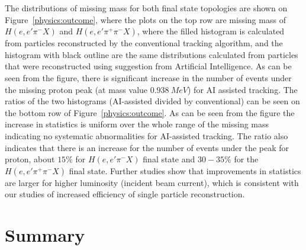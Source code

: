 The distributions of missing mass for both final state topologies are shown on Figure~\ref{physics:outcome}, where the plots 
on the top row are missing mass of $H(e,e'\pi^-X)$ and $H(e,e'\pi^+\pi^-X)$, where the filled histogram is calculated from 
particles reconstructed by the conventional tracking algorithm, and the histogram with black outline are the same distributions 
calculated from particles that were reconstructed using suggestion from Artificial Intelligence. As can be seen from the figure, 
there is significant increase in the number of events under the missing proton peak (at mass value $0.938~MeV$) for AI assisted
tracking. The ratios of the two histograms (AI-assisted divided by conventional) can be seen on the bottom row of 
Figure~\ref{physics:outcome}. As can be seen from the figure the increase in statistics is uniform over the whole range of the 
missing mass indicating no systematic abnormalities for AI-assisted tracking. The ratio also indicates that there is an increase 
for the number of events under the peak for proton, about $15\%$ for $H(e,e'\pi^-X)$ final state and $30-35\%$ for the $H(e,e'\pi^+\pi^-X)$
final state. Further studies show that improvements in statistics are larger for higher luminosity (incident beam current), which is consistent with our studies of increased efficiency of single particle reconstruction.


\section{Summary}

